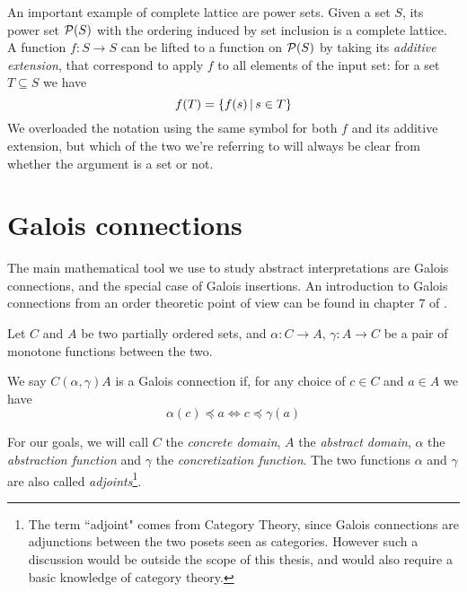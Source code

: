 An important example of complete lattice are power sets. Given a set $S$, its power set $\mathcal{P}(S)$ with the ordering induced by set inclusion is a complete lattice. A function $f : S \rightarrow S$ can be lifted to a function on $\mathcal{P}(S)$ by taking its \textit{additive extension}, that correspond to apply $f$ to all elements of the input set: for a set $T \subseteq S$ we have
\[
f(T) = \{ f(s) \,\vert\, s \in T \}
\]
We overloaded the notation using the same symbol for both $f$ and its additive extension, but which of the two we're referring to will always be clear from whether the argument is a set or not.

\section{Galois connections}
The main mathematical tool we use to study abstract interpretations are Galois connections, and the special case of Galois insertions. An introduction to Galois connections from an order theoretic point of view can be found in chapter 7 of \cite{order-theory-book}.

\begin{definition}\label{ch2:def:gc}
	Let $C$ and $A$ be two partially ordered sets, and $\alpha : C \rightarrow A$, $\gamma : A \rightarrow C$ be a pair of monotone functions between the two.

	We say $C (\alpha, \gamma) A$ is a Galois connection if, for any choice of $c \in C$ and $a \in A$ we have
	\[
	\alpha(c) \preceq a \iff c \preceq \gamma(a)
	\]
\end{definition}
For our goals, we will call $C$ the \textit{concrete domain}, $A$ the \textit{abstract domain}, $\alpha$ the \textit{abstraction function} and $\gamma$ the \textit{concretization function}. The two functions $\alpha$ and $\gamma$ are also called \textit{adjoints}\footnote{The term ``adjoint" comes from Category Theory, since Galois connections are adjunctions between the two posets seen as categories. However such a discussion would be outside the scope of this thesis, and would also require a basic knowledge of category theory.}.

